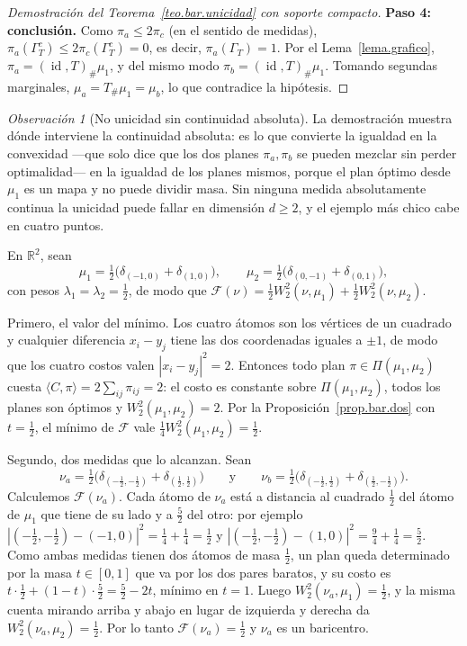 \documentclass[12pt, a4paper]{amsbook}
\newcommand{\id}{\operatorname{id}}
\newcommand{\R}{{\mathbb R}}
\theoremstyle{remark}
\newtheorem{obs}[teo]{Observación}
\theoremstyle{definition}
\numberwithin{section}{chapter}
\numberwithin{subsection}{section}
\numberwithin{equation}{section}
\numberwithin{figure}{chapter}
\begin{document}
\begin{proof}[Demostración del Teorema~\ref{teo.bar.unicidad} con soporte compacto]
\medskip
\textbf{Paso 4: conclusión.}
Como $\pi_a\le2\pi_c$ (en el sentido de medidas), $\pi_a(\Gamma_T^c)\le2\pi_c(\Gamma_T^c)=0$,
es decir, $\pi_a(\Gamma_T)=1$. Por el Lema~\ref{lema.grafico},
$\pi_a=(\id,T)_\#\mu_1$, y del mismo modo $\pi_b=(\id,T)_\#\mu_1$. Tomando
segundas marginales, $\mu_a=T_\#\mu_1=\mu_b$, lo que contradice la hipótesis.
\end{proof}

\begin{obs}[No unicidad sin continuidad absoluta]\label{obs.bar.no.unicidad}
La demostración muestra dónde interviene la continuidad absoluta: es lo que
convierte la igualdad en la convexidad —que solo dice que los dos planes
$\pi_a,\pi_b$ se pueden mezclar sin perder optimalidad— en la igualdad de los
planes mismos, porque el plan óptimo desde $\mu_1$ es un mapa y no puede
dividir masa. Sin ninguna medida absolutamente continua la unicidad puede
fallar en dimensión $d\ge2$, y el ejemplo más chico cabe en cuatro puntos.

En $\R^2$, sean
\[
\mu_1=\tfrac12\bigl(\delta_{(-1,0)}+\delta_{(1,0)}\bigr),
\qquad
\mu_2=\tfrac12\bigl(\delta_{(0,-1)}+\delta_{(0,1)}\bigr),
\]
con pesos $\lambda_1=\lambda_2=\tfrac12$, de modo que
$\mathcal F(\nu)=\tfrac12W_2^2(\nu,\mu_1)+\tfrac12W_2^2(\nu,\mu_2)$.

Primero, el valor del mínimo. Los cuatro átomos son los vértices de un
cuadrado y cualquier diferencia $x_i-y_j$ tiene las dos coordenadas iguales a
$\pm1$, de modo que los cuatro costos valen $|x_i-y_j|^2=2$. Entonces todo
plan $\pi\in\Pi(\mu_1,\mu_2)$ cuesta $\langle C,\pi\rangle=2\sum_{ij}\pi_{ij}=2$:
el costo es constante sobre $\Pi(\mu_1,\mu_2)$, todos los planes son óptimos
y $W_2^2(\mu_1,\mu_2)=2$. Por la Proposición~\ref{prop.bar.dos} con
$t=\tfrac12$, el mínimo de $\mathcal F$ vale
$\tfrac14W_2^2(\mu_1,\mu_2)=\tfrac12$.

Segundo, dos medidas que lo alcanzan. Sean
\[
\nu_a=\tfrac12\bigl(\delta_{(-\frac12,-\frac12)}+\delta_{(\frac12,\frac12)}\bigr)
\qquad\text{y}\qquad
\nu_b=\tfrac12\bigl(\delta_{(-\frac12,\frac12)}+\delta_{(\frac12,-\frac12)}\bigr).
\]
Calculemos $\mathcal F(\nu_a)$. Cada átomo de $\nu_a$ está a distancia al
cuadrado $\tfrac12$ del átomo de $\mu_1$ que tiene de su lado y a $\tfrac52$
del otro: por ejemplo
$|(-\tfrac12,-\tfrac12)-(-1,0)|^2=\tfrac14+\tfrac14=\tfrac12$ y
$|(-\tfrac12,-\tfrac12)-(1,0)|^2=\tfrac94+\tfrac14=\tfrac52$. Como ambas
medidas tienen dos átomos de masa $\tfrac12$, un plan queda determinado por
la masa $t\in[0,1]$ que va por los dos pares baratos, y su costo es
$t\cdot\tfrac12+(1-t)\cdot\tfrac52=\tfrac52-2t$, mínimo en $t=1$. Luego
$W_2^2(\nu_a,\mu_1)=\tfrac12$, y la misma cuenta mirando arriba y abajo en
lugar de izquierda y derecha da $W_2^2(\nu_a,\mu_2)=\tfrac12$. Por lo tanto
$\mathcal F(\nu_a)=\tfrac12$ y $\nu_a$ es un baricentro.


\end{obs}
\end{document}
